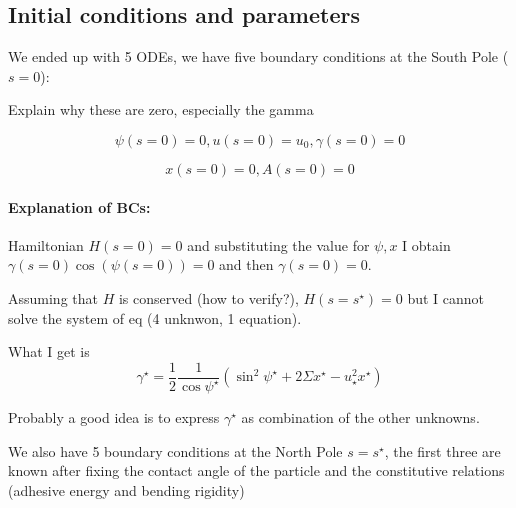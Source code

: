 \documentclass[12pt]{article}
\begin{document}






\subsection{Initial conditions and parameters}
We ended up with 5 ODEs, we have five boundary conditions at the South Pole ($s=0$):

\alert{Explain why these are zero, especially the gamma }

$$
\psi(s=0)=0, u(s=0)=u_0, \gamma(s=0)=0
$$

$$
x(s=0) = 0, A(s=0)=0
$$

\paragraph*{Explanation of BCs:}
Hamiltonian $H(s=0)=0$ and substituting the value for $\psi,x$ I obtain $\gamma(s=0) \cos(\psi(s=0))=0$ and then $\gamma(s=0)=0$. 

Assuming that $H$ is conserved (\alert{how to verify?}), $H(s=s^\star)=0$ but I cannot solve the system of eq (4 unknwon, 1 equation).

What I get is $$
\gamma^\star=\frac{1}{2} \frac{1}{\cos \psi^\star} \left(\sin ^2 \psi^\star +2 \Sigma x^\star - u_\star^2 x^\star \right)
$$

Probably a good idea is to express $\gamma^\star$ as combination of the other unknowns.





We also have 5 boundary conditions at the North Pole $s=s^\star$, the first three are known after fixing the contact angle of the particle and the constitutive relations (adhesive energy and bending rigidity) 
\end{document}

